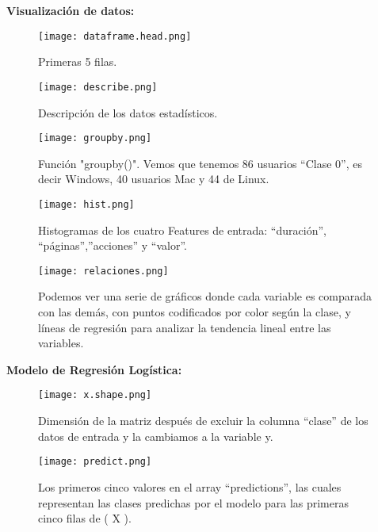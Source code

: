 \documentclass{pssbmac}
\begin{document}
\textbf{Visualización de datos: }

\begin{figure}[H]
\centering
\texttt{[image: dataframe.head.png]}
\caption{ {\small Primeras 5 filas.}}
\label{figura01}
\end{figure}


\begin{figure}[H]
\centering
\texttt{[image: describe.png]}
\caption{ {\small Descripción de los datos estadísticos. }}
\label{figura02}
\end{figure}

\begin{figure}[H]
\centering
\texttt{[image: groupby.png]}
\caption{ {\small Función "groupby()".  Vemos que tenemos 86 usuarios ``Clase 0”, es decir Windows, 40 usuarios Mac y 44 de Linux.}}
\label{figura03}
\end{figure}
\begin{figure}[H]
\centering
\texttt{[image: hist.png]}
\caption{ {\small Histogramas de los cuatro Features de entrada: “duración”, “páginas”,”acciones” y “valor”.}}
\label{figura04}
\end{figure}

\begin{figure}[H]
\centering
\texttt{[image: relaciones.png]}
\caption{ {\small Podemos ver una serie de gráficos donde cada variable es comparada con las demás, con puntos codificados por color según la clase, y líneas de regresión para analizar la tendencia lineal entre las variables.}}
\label{figura05}
\end{figure}




\textbf{Modelo de Regresión Logística:}

\begin{figure}[H]
\centering
\texttt{[image: x.shape.png]}
\caption{ {\small Dimensión de la matriz después de excluir la columna ``clase'' de los datos de entrada y la cambiamos a la variable y. }}
\label{figura06}
\end{figure}



\begin{figure}[H]
\centering
\texttt{[image: predict.png]}
\caption{ {\small Los primeros cinco valores en el array ``predictions'', las cuales representan las clases predichas por el modelo para las primeras cinco filas de ( X ).}}
\label{figura07}
\end{figure}
\end{document}
